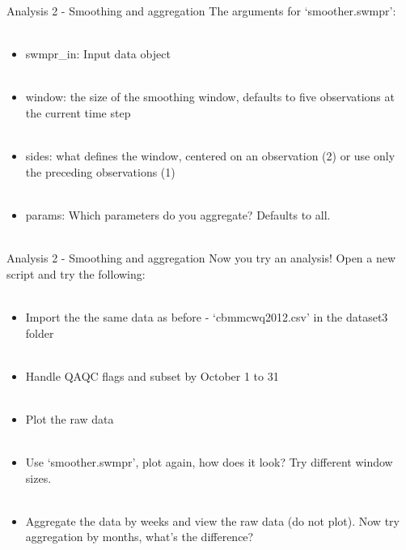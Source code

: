 \documentclass[xcolor=svgnames]{beamer}\usepackage[]{graphicx}\usepackage[]{color}
\begin{document}
\begin{frame}[containsverbatim]{Analysis 2 - Smoothing and aggregation}
The arguments for `smoother.swmpr':\\~\\
\begin{itemize}
\item swmpr\_in: Input data object \\~\\
\item window: the size of the smoothing window, defaults to five observations at the current time step \\~\\
\item sides: what defines the window, centered on an observation (2) or use only the preceding observations (1)  \\~\\
\item params: Which parameters do you aggregate? Defaults to all. \\~\\
\end{itemize}
\end{frame}

\begin{frame}[containsverbatim]{Analysis 2 - Smoothing and aggregation}
Now you try an analysis! Open a new script and try the following: \\~\\
\begin{itemize}
\item Import the the same data as before - `cbmmcwq2012.csv' in the dataset3 folder \\~\\
\item Handle QAQC flags and subset by October 1 to 31 \\~\\
\item Plot the raw data \\~\\
\item Use `smoother.swmpr', plot again, how does it look? Try different window sizes.\\~\\
\item Aggregate the data by weeks and view the raw data (do not plot).  Now try aggregation by months, what's the difference?\\~\\
\end{itemize}
\end{frame}
\end{document}
